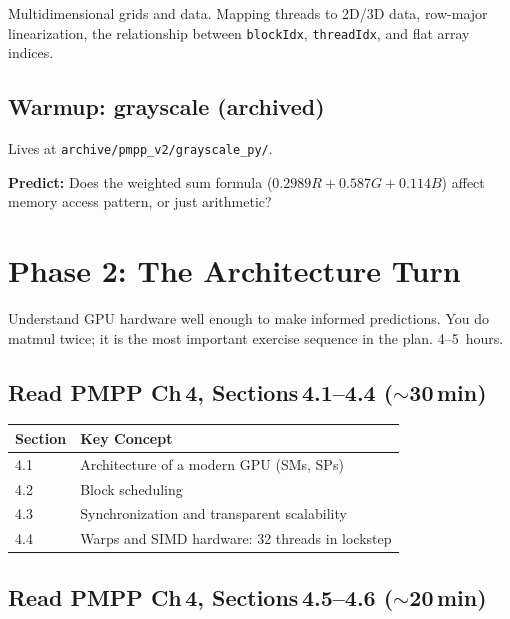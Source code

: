 \documentclass[11pt, letterpaper]{article}
\begin{document}
Multidimensional grids and data. Mapping threads to 2D/3D data, row-major linearization, the relationship between \texttt{blockIdx}, \texttt{threadIdx}, and flat array indices.

\subsection{Warmup: grayscale (archived)}

Lives at \texttt{archive/pmpp\_v2/grayscale\_py/}.

\begin{stepbox}
\textbf{Predict:} Does the weighted sum formula ($0.2989R + 0.587G + 0.114B$) affect memory access pattern, or just arithmetic?
\end{stepbox}

\section{Phase 2: The Architecture Turn}

\begin{phasebox}[Goal]
Understand GPU hardware well enough to make informed predictions. You do matmul twice; it is the most important exercise sequence in the plan. 4--5~hours.
\end{phasebox}

\subsection{Read PMPP Ch\,4, Sections\,4.1--4.4 ($\sim$30\,min)}

\begin{tabularx}{\textwidth}{@{}lX@{}}
\toprule
\textbf{Section} & \textbf{Key Concept} \\
\midrule
4.1 & Architecture of a modern GPU (SMs, SPs) \\
4.2 & Block scheduling \\
4.3 & Synchronization and transparent scalability \\
4.4 & Warps and SIMD hardware: 32 threads in lockstep \\
\bottomrule
\end{tabularx}

\subsection{Read PMPP Ch\,4, Sections\,4.5--4.6 ($\sim$20\,min)}
\end{document}
